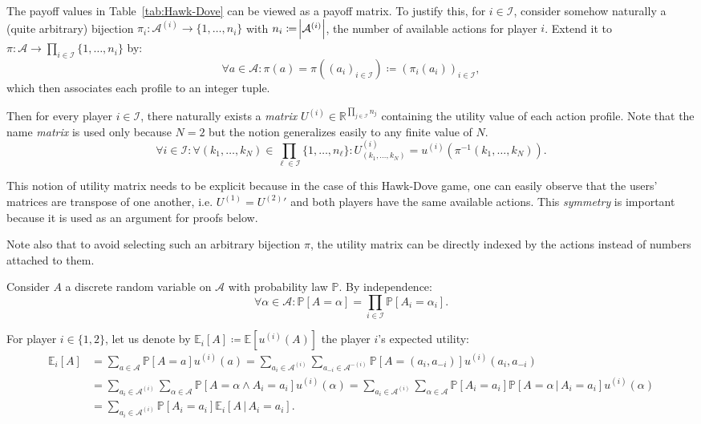 \documentclass{article}
\renewcommand{\P}{\mathbb P}
\newcommand{\E}{\mathbb E}
\newcommand{\R}{\mathbb R}
\begin{document}
The payoff values in Table~\ref{tab:Hawk-Dove} can be viewed as a payoff matrix. To justify this, for
$i \in \mathcal I$, consider somehow naturally a (quite arbitrary) bijection
$\pi_i : \mathcal A^{(i)} \to \{1, \ldots, n_i\}$ with $n_i \coloneqq \abs {\mathcal A^{(i)}}$, the number of
available actions for player $i$. Extend it to
$\pi : \mathcal A \to \prod_{i \in \mathcal I}\{1, \ldots, n_i\}$
by:
\[\forall a \in \mathcal A : \pi(a) = \pi((a_i)_{i \in \mathcal I}) \coloneqq (\pi_i(a_i))_{i \in \mathcal I},\]
which then associates each profile to an integer tuple.

Then for every player $i \in \mathcal I$, there naturally exists a \textit{matrix} $U^{(i)} \in \R^{\prod_{j \in \mathcal I}n_j}$
containing the utility value of each action profile. Note that the name \textit{matrix} is used only because
$N=2$ but the notion generalizes easily to any finite value of $N$.
\[\forall i \in \mathcal I : \forall (k_1, \ldots, k_N) \in \prod_{\ell \in \mathcal I}\{1, \ldots, n_\ell\} :
	U^{(i)}_{(k_1, \ldots, k_N)} = u^{(i)}(\pi^{-1}(k_1, \ldots, k_N)).\]

This notion of utility matrix needs to be explicit because in the case of this Hawk-Dove game, one can
easily observe that the users' matrices are transpose of one another, i.e. $U^{(1)} = {U^{(2)}}'$ and both
players have the same available actions. This \textit{symmetry} is important because it is used as
an argument for proofs below.

Note also that to avoid selecting such an arbitrary bijection $\pi$, the utility matrix can be directly indexed
by the actions instead of numbers attached to them.

Consider $A$ a discrete random variable on $\mathcal A$ with probability law $\P$. By independence:
\[\forall \alpha \in \mathcal A : \P[A = \alpha] = \prod_{i \in \mathcal I}\P[A_i = \alpha_i].\]

For player $i \in \{1, 2\}$, let us denote by $\E_i[A] \coloneqq \E[u^{(i)}(A)]$ the player $i$'s expected
utility:
\begin{align*}
\E_i[A] &= \sum_{a \in \mathcal A}\P[A = a]u^{(i)}(a) =
\sum_{a_i \in \mathcal A^{(i)}}\sum_{a_{-i} \in \mathcal A^{-(i)}}\P[A = (a_i, a_{-i})]u^{(i)}(a_i, a_{-i}) \\
&= \sum_{a_i \in \mathcal A^{(i)}}\sum_{\alpha \in \mathcal A}\P[A = \alpha \land A_i = a_i]u^{(i)}(\alpha)
= \sum_{a_i \in \mathcal A^{(i)}}\sum_{\alpha \in \mathcal A}\P[A_i = a_i]\P[A = \alpha \, | \, A_i = a_i]u^{(i)}(\alpha) \\
&= \sum_{a_i \in \mathcal A^{(i)}}\P[A_i = a_i]\E_i[A \, | \, A_i = a_i].
\end{align*}
\end{document}
